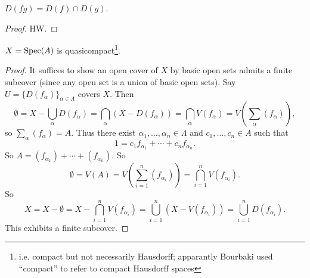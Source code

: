 \documentclass[12pt]{article}
\begin{document}
\begin{proposition}
	$D(fg) = D(f) \cap D(g)$.
\end{proposition}
\begin{proof}
	HW.
\end{proof}

\begin{proposition}
	$X=\text{Spec}(A)$ is quasicompact\footnote{i.e. compact but not necessarily Hausdorff; apparantly Bourbaki used ``compact'' to refer to compact Hausdorff spaces}.
\end{proposition}
\begin{proof}
	It suffices to show an open cover of $X$ by basic open sets admits a finite subcover (since any open set is a union of basic open sets). Say $U=\{D(f_\alpha)\}_{\alpha\in\Lambda}$ covers $X$. Then 
	\begin{equation*}
		\emptyset = X - \bigcup_{\alpha}D(f_\alpha) = \bigcap_\alpha (X-D(f_\alpha)) = \bigcap_\alpha V(f_\alpha) = V(\sum_\alpha(f_\alpha)),
	\end{equation*}
	so $\sum_\alpha(f_\alpha) = A$. Thus there exist $\alpha_1,\dots,\alpha_n\in\Lambda$ and $c_1,\dots,c_n\in A$ such that 
	\begin{equation*}
		1 = c_1f_{\alpha_1} + \cdots + c_nf_{\alpha_n}.
	\end{equation*}
	So $A = (f_{\alpha_1}) + \cdots + (f_{\alpha_n})$. So 
	\begin{equation*}
		\emptyset = V(A) = V(\sum_{i=1}^n (f_{\alpha_i})) =\bigcap_{i=1}^n V(f_{\alpha_i}).
	\end{equation*}
	So 
	\begin{equation*}
		X = X-\emptyset = X-\bigcap_{i=1}^n V(f_{\alpha_i}) = \bigcup_{i=1}^n (X - V(f_{\alpha_i})) = \bigcup_{i=1}^n D(f_{\alpha_i}).
	\end{equation*}
	This exhibits a finite subcover.
\end{proof}
\end{document}
